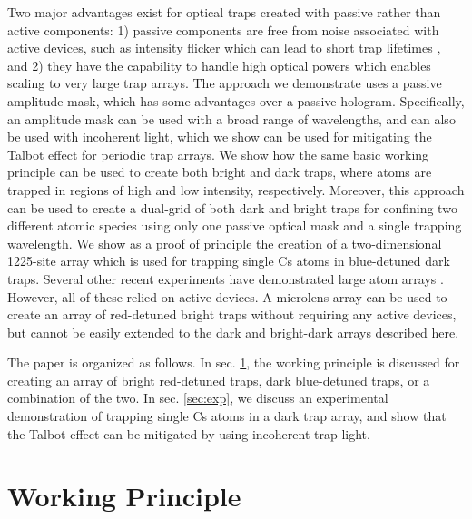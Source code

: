 Two major advantages exist for optical traps created with passive rather than active components: 1) passive components are free from noise associated with active devices, such as intensity flicker which can lead to short trap lifetimes \cite{Stuart2018}, and 2) they have the capability to handle high optical powers which enables scaling to very large trap arrays. The approach we demonstrate uses a passive amplitude mask, which has some advantages over a passive hologram. Specifically, an amplitude mask can be used with a broad range of wavelengths, and can also be used with incoherent light, which we show can be used for mitigating the Talbot effect for periodic trap arrays. We show how the same basic working principle can be used to create both bright and dark traps, where atoms are trapped in regions of high and low intensity, respectively. Moreover, this approach can be used to create a dual-grid of both dark and bright traps for confining two different atomic species\cite{Singh2022} using only one passive optical mask and a single trapping wavelength. We show as a proof of principle the creation of a two-dimensional 1225-site  array which is used for trapping single Cs atoms in blue-detuned dark traps. Several other recent experiments have demonstrated large atom arrays \cite{YWang2020,Scholl2021,Ebadi2021}. However, all of these relied on active devices. A microlens array can be used to create an array of red-detuned bright traps without requiring any active devices\cite{deMello2019}, but cannot be easily extended to the dark and bright-dark arrays described here.  

The paper is organized as follows. In sec. \ref{sec:theory}, the working principle is discussed for creating an array of bright red-detuned traps, dark blue-detuned traps, or a combination of the two. In sec. \ref{sec:exp}, we discuss an experimental demonstration of trapping single Cs atoms in a dark trap array, and show that the Talbot effect can be mitigated by using incoherent trap light. 

\section{Working Principle} \label{sec:theory}

